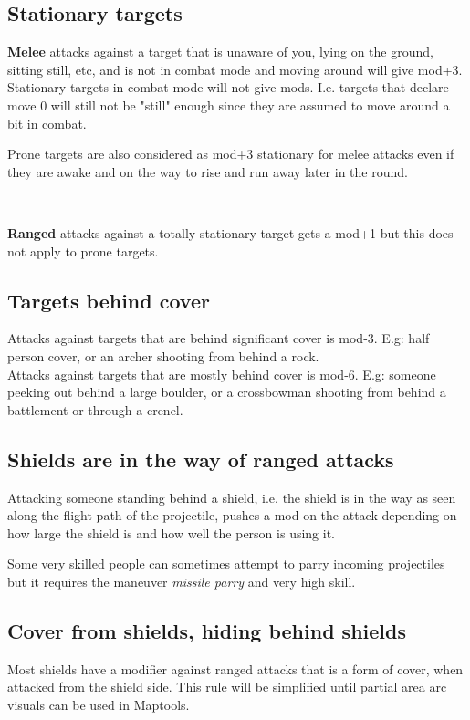 \subsection*{Stationary targets}
\textbf{Melee} attacks against a target that is unaware of you, lying on the ground, sitting still, etc, and is not in combat mode and moving around will give mod+3. Stationary targets in combat mode will not give mods. I.e. targets that declare move 0 will still not be "still" enough since they are assumed to move around a bit in combat.

Prone targets are also considered as mod+3 stationary for melee attacks even if they are awake and on the way to rise and run away later in the round. 

\

\noindent \textbf{Ranged} attacks against a totally stationary target gets a mod+1 but this does not apply to prone targets.


\subsection*{Targets behind cover}
Attacks against targets that are behind significant cover is mod-3. E.g: half person cover, or an archer shooting from behind a rock. \\
Attacks against targets that are mostly behind cover is mod-6. E.g: someone peeking out behind a large boulder, or a crossbowman shooting from behind a battlement or through a crenel.


\subsection*{Shields are in the way of ranged attacks}
Attacking someone standing behind a shield, i.e. the shield is in the way as seen along the flight path of the projectile, pushes a mod on the attack depending on how large the shield is and how well the person is using it.

Some very skilled people can sometimes attempt to parry incoming projectiles but it requires the maneuver \emph{missile parry} and very high skill.


\subsection*{Cover from shields, hiding behind shields}
Most shields have a modifier against ranged attacks that is a form of cover, when attacked from the shield side. This rule will be simplified until partial area arc visuals can be used in Maptools.

